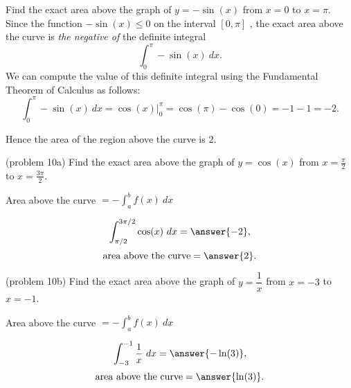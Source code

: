 \documentclass{ximera}
\begin{document}
\begin{example}[example 10]
Find the exact area above the graph of $y = -\sin(x)$ from $x = 0$ to $x = \pi$. \\
Since the function $-\sin(x) \leq 0$ on the interval $[0, \pi]$ , the exact area above the curve is \textit{the negative of} the definite integral 
\[\int_{0}^\pi -\sin(x) \ dx.\]
We can compute the value of this definite integral using the Fundamental Theorem of Calculus as follows:
\[\int_0^\pi -\sin(x) \ dx = \cos(x) \Big|_{0}^\pi = \cos(\pi) - \cos(0) = -1 -1 = -2.\]

Hence the area of the region above the curve is $2$.


\begin{image}
\end{image}
\end{example}



\begin{problem}(problem 10a)
Find the exact area above the graph of $y = \cos(x)$ from $x = \frac{\pi}{2}$ to $x = \frac{3\pi}{2}$. \\
\begin{hint}
Area above the curve $= -\int_a^b f(x) \ dx$
\end{hint}
\[\int_{\pi/2}^{3\pi/2} \cos(x) \ dx = \answer{-2},\]
\[\text{area above the curve} = \answer{2}.\]
\end{problem}


\begin{problem}(problem 10b)
Find the exact area above the graph of $y = \dfrac{1}{x}$ from $x = -3$ to $x = -1$. \\
\begin{hint}
Area above the curve $= -\int_a^b f(x) \ dx$
\end{hint}
\[\int_{-3}^{-1} \frac{1}{x} \ dx = \answer{-\ln(3)},\]
\[\text{area above the curve} = \answer{\ln(3)}.\]
\end{problem}
\end{document}
